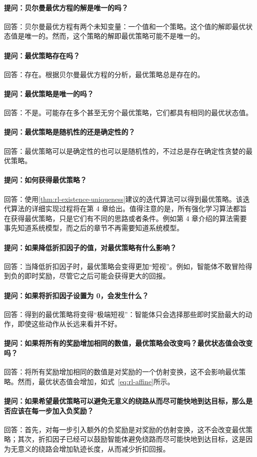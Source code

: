 \paragraph{提问：贝尔曼最优方程的解是唯一的吗？}
回答：贝尔曼最优方程有两个未知变量：一个值和一个策略。这个值的解即最优状态值是唯一的。然而，这个策略的解即最优策略可能不是唯一的。

\paragraph{提问：最优策略存在吗？}
回答：存在。根据贝尔曼最优方程的分析，最优策略总是存在的。

\paragraph{提问：最优策略是唯一的吗？}
回答：不是。可能存在多个甚至无穷个最优策略，它们都具有相同的最优状态值。

\paragraph{提问：最优策略是随机性的还是确定性的？}
回答：最优策略可以是确定性的也可以是随机性的，不过总是存在确定性贪婪的最优策略。

\paragraph{提问：如何获得最优策略？}
回答：使用\cref{thm:rl-existence-uniqueness}建议的迭代算法可以得到最优策略。该迭代算法的详细实现过程将在第 4 章给出。值得注意的是，所有强化学习算法都旨在获得最优策略，只是它们有不同的思路或者条件。例如第 4 章介绍的算法需要事先知道系统模型，而之后的章节不再需要知道系统模型。

\paragraph{提问：如果降低折扣因子的值，对最优策略有什么影响？}
回答：当降低折扣因子时，最优策略会变得更加“短视”。例如，智能体不敢冒险得到负的即时奖励，尽管它之后可能会获得更大的回报。

\paragraph{提问：如果将折扣因子设置为 0，会发生什么？}
回答：得到的最优策略将变得“极端短视”：智能体只会选择那些即时奖励最大的动作，即使这些动作从长远来看并不好。

\paragraph{提问：如果将所有的奖励增加相同的数值，最优策略会改变吗？最优状态值会改变吗？}
回答：将所有奖励增加相同的数值是对奖励的一个仿射变换，这不会影响最优策略。然而，最优状态值会增加，如式~\eqref{eq:rl-affine}所示。

\paragraph{提问：如果希望最优策略可以避免无意义的绕路从而尽可能快地到达目标，那么是否应该在每一步加入负奖励？}
回答：首先，对每一步引入额外的负奖励是对奖励的仿射变换，这不会改变最优策略；其次，折扣因子已经可以鼓励智能体避免绕路而尽可能快地到达目标，这是因为无意义的绕路会增加轨迹长度，从而减少折扣回报。
